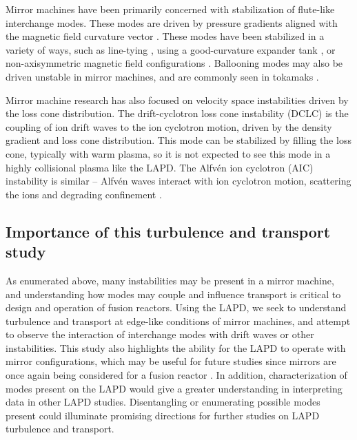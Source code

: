 Mirror machines have been primarily concerned with stabilization of flute-like interchange modes. These modes are driven by pressure gradients aligned with the magnetic field curvature vector \cite{Post_1987, ferron_interchange_1983, wickham_curvature-induced_1982}. These modes have been stabilized in a variety of ways, such as line-tying \cite{Fornaca_1979}, using a good-curvature expander tank \cite{Ryutov_2011,Ivanov_2013}, or non-axisymmetric magnetic field configurations \cite{moir_yin-yang_1969}. Ballooning modes \cite{dippolito_low-_1981} may also be driven unstable in mirror machines, and are commonly seen in tokamaks \cite{strait_stability_1994, connor_review_1998}.

Mirror machine research has also focused on velocity space instabilities driven by the loss cone distribution. The drift-cyclotron loss cone instability (DCLC) \cite{baldwin_potential-confined_1979, ferron_dependence_1984, kotelnikov_electrostatic_2017} is the coupling of ion drift waves to the ion cyclotron motion, driven by the density gradient and loss cone distribution. This mode can be stabilized by filling the loss cone, typically with warm plasma, so it is not expected to see this mode in a highly collisional plasma like the LAPD. The Alfv\'en ion cyclotron (AIC) instability is similar -- Alfv\'en waves interact with ion cyclotron motion, scattering the ions and degrading confinement \cite{Casper_1982}. 

\subsection{Importance of this turbulence and transport study}

As enumerated above, many instabilities may be present in a mirror machine, and understanding how modes may couple and influence transport is critical to design and operation of fusion reactors. Using the LAPD, we seek to understand turbulence and transport at edge-like conditions of mirror machines, and attempt to observe the interaction of interchange modes with drift waves or other instabilities. This study also highlights the ability for the LAPD to operate with mirror configurations, which may be useful for future studies since mirrors are once again being considered for a fusion reactor \cite{WHAM, BEAM, frank_integrated_2024}. In addition, characterization of modes present on the LAPD would give a greater understanding in interpreting data in other LAPD studies. Disentangling or enumerating possible modes present could illuminate promising directions for further studies on LAPD turbulence and transport.

